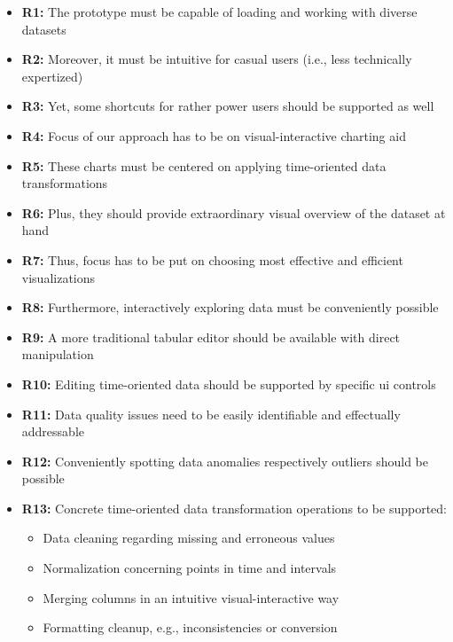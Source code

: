 \begin{itemize}
  \item \textbf{R1:} The prototype must be capable of loading and working with diverse datasets
  \item \textbf{R2:} Moreover, it must be intuitive for casual users (i.e., less technically expertized)
  \item \textbf{R3:} Yet, some shortcuts for rather power users should be supported as well
  \item \textbf{R4:} Focus of our approach has to be on visual-interactive charting aid
  \item \textbf{R5:} These charts must be centered on applying time-oriented data transformations
  \item \textbf{R6:} Plus, they should provide extraordinary visual overview of the dataset at hand
  \item \textbf{R7:} Thus, focus has to be put on choosing most effective and efficient visualizations
  \item \textbf{R8:} Furthermore, interactively exploring data must be conveniently possible
  \item \textbf{R9:} A more traditional tabular editor should be available with direct manipulation
  \item \textbf{R10:} Editing time-oriented data should be supported by specific \gls{ui} controls
  \item \textbf{R11:} Data quality issues need to be easily identifiable and effectually addressable
  \item \textbf{R12:} Conveniently spotting data anomalies respectively outliers should be possible
  \item \textbf{R13:} Concrete time-oriented data transformation operations to be supported:
  \begin{itemize}
    \item Data cleaning regarding missing and erroneous values
    \item Normalization concerning points in time and intervals
    \item Merging columns in an intuitive visual-interactive way
    \item Formatting cleanup, e.g., inconsistencies or conversion
  \end{itemize}
\end{itemize}


